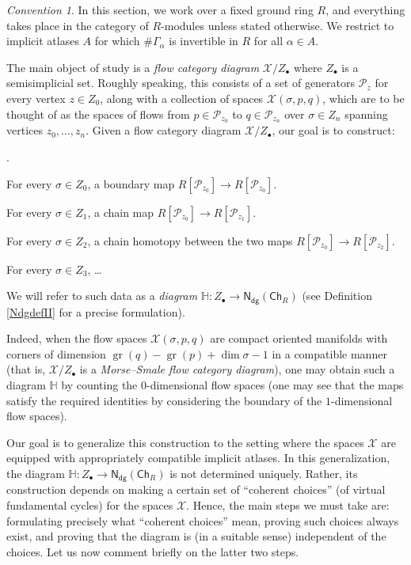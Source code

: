 \documentclass[12pt]{article}
\theoremstyle{definition}
\theoremstyle{remark}
\newtheorem{convention}[theorem]{Convention}
\numberwithin{equation}{subsection}
\newcommand{\X}{\mathcal X}
\newcommand{\HH}{\mathbb H}
\newcommand{\PPP}{\mathcal P}
\newcommand{\Ch}{\mathsf{Ch}}
\newcommand{\Ndg}{\mathsf{N}_{\mathsf{dg}}}
\newcommand{\gr}{\operatorname{gr}}
\newcounter{rcounti}
\newenvironment{rlist}{\begin{list}{\roman{rcounti}.}{\usecounter{rcounti}
\setlength\itemsep{0pt}
\setlength\labelsep{4pt}
\setlength\labelwidth{16pt}
\setlength\leftmargin{32pt}
\setlength\listparindent{0pt}
\setlength\parsep{0pt}
\setlength\parskip{0pt}
\setlength\partopsep{0pt}
\setlength\rightmargin{0pt}
\setlength\topsep{0pt}
\setlength\itemindent{0pt}
}}{\end{list}}
\begin{document}
\begin{convention}
In this section, we work over a fixed ground ring $R$, and everything takes place in the category of $R$-modules unless stated otherwise.  We restrict to implicit atlases $A$ for which $\#\Gamma_\alpha$ is invertible in $R$ for all $\alpha\in A$.
\end{convention}

The main object of study is a \emph{flow category diagram} $\X/Z_\bullet$ where $Z_\bullet$ is a semisimplicial set.  Roughly speaking, this consists of a set of generators $\PPP_z$ for every vertex $z\in Z_0$, along with a collection of spaces $\X(\sigma,p,q)$, which are to be thought of as the spaces of flows from $p\in\PPP_{z_0}$ to $q\in\PPP_{z_n}$ over $\sigma\in Z_n$ spanning vertices $z_0,\ldots,z_n$.  Given a flow category diagram $\X/Z_\bullet$, our goal is to construct:
\begin{rlist}
\item For every $\sigma\in Z_0$, a boundary map $R[\PPP_{z_0}]\to R[\PPP_{z_0}]$.
\item For every $\sigma\in Z_1$, a chain map $R[\PPP_{z_0}]\to R[\PPP_{z_1}]$.
\item For every $\sigma\in Z_2$, a chain homotopy between the two maps $R[\PPP_{z_0}]\to R[\PPP_{z_2}]$.
\item For every $\sigma\in Z_3$, \ldots
\end{rlist}
We will refer to such data as a \emph{diagram} $\HH:Z_\bullet\to\Ndg(\Ch_R)$ (see Definition \ref{NdgdefII} for a precise formulation).

Indeed, when the flow spaces $\X(\sigma,p,q)$ are compact oriented manifolds with corners of dimension $\gr(q)-\gr(p)+\dim\sigma-1$ in a compatible manner (that is, $\X/Z_\bullet$ is a \emph{Morse--Smale flow category diagram}), one may obtain such a diagram $\HH$ by counting the $0$-dimensional flow spaces (one may see that the maps satisfy the required identities by considering the boundary of the $1$-dimensional flow spaces).

Our goal is to generalize this construction to the setting where the spaces $\X$ are equipped with appropriately compatible implicit atlases.  In this generalization, the diagram $\HH:Z_\bullet\to\Ndg(\Ch_R)$ is not determined uniquely.  Rather, its construction depends on making a certain set of ``coherent choices'' (of virtual fundamental cycles) for the spaces $\X$.  Hence, the main steps we must take are: formulating precisely what ``coherent choices'' mean, proving such choices always exist, and proving that the diagram is (in a suitable sense) independent of the choices.  Let us now comment briefly on the latter two steps.
\end{document}
